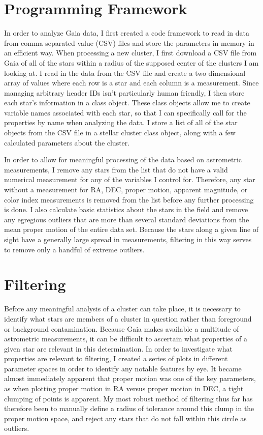 \documentclass[aps,prb,twocolumn,groupedaddress,nofootinbib,floatfix]{revtex4-1}
\begin{document}
\section*{Programming Framework}
In order to analyze Gaia data, I first created a code framework to read in data from comma separated value (CSV) files and store the parameters in memory in an efficient way. When processing a new cluster, I first download a CSV file from Gaia of all of the stars within a radius of the supposed center of the clusters I am looking at. I read in the data from the CSV file and create a two dimensional array of values where each row is a star and each column is a measurement. Since managing arbitrary header IDs isn't particularly human friendly, I then store each star's information in a class object. These class objects allow me to create variable names associated with each star, so that I can specifically call for the properties by name when analyzing the data. I store a list of all of the star objects from the CSV file in a stellar cluster class object, along with a few calculated parameters about the cluster.

In order to allow for meaningful processing of the data based on astrometric measurements, I remove any stars from the list that do not have a valid numerical measurement for any of the variables I control for. Therefore, any star without a measurement for RA, DEC, proper motion, apparent magnitude, or color index measurements is removed from the list before any further processing is done. I also calculate basic statistics about the stars in the field and remove any egregious outliers that are more than several standard deviations from the mean proper motion of the entire data set. Because the stars along a given line of sight have a generally large spread in measurements, filtering in this way serves to remove only a handful of extreme outliers.


\section*{Filtering}
Before any meaningful analysis of a cluster can take place, it is necessary to identify what stars are members of a cluster in question rather than foreground or background contamination. Because Gaia makes available a multitude of astrometric measurements, it can be difficult to ascertain what properties of a given star are relevant in this determination. In order to investigate what properties are relevant to filtering, I created a series of plots in different parameter spaces in order to identify any notable features by eye. It became almost immediately apparent that proper motion was one of the key parameters, as when plotting proper motion in RA versus proper motion in DEC, a tight clumping of points is apparent. My most robust method of filtering thus far has therefore been to manually define a radius of tolerance around this clump in the proper motion space, and reject any stars that do not fall within this circle as outliers.
\end{document}
